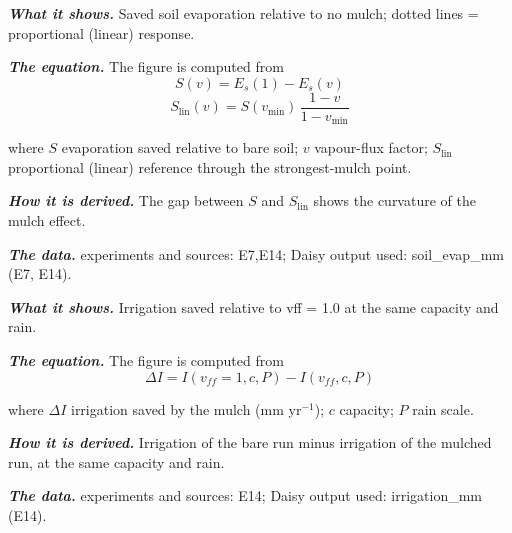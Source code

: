 \label{fig:a20_14}
\par\noindent\textbf{\color{khmag}\emph{What it shows.}} Saved soil evaporation relative to no mulch; dotted lines = proportional (linear) response.
\par\noindent\textbf{\color{khmag}\emph{The equation.}} The figure is computed from
\begin{equation}\boxed{S(v)=E_s(1)-E_s(v)}\end{equation}
\begin{equation}\boxed{S_{\mathrm{lin}}(v)=S(v_{\min})\,\dfrac{1-v}{1-v_{\min}}}\end{equation}
\par\noindent where $S$ evaporation saved relative to bare soil; $v$ vapour-flux factor; $S_{\mathrm{lin}}$ proportional (linear) reference through the strongest-mulch point.
\par\noindent\textbf{\color{khmag}\emph{How it is derived.}} The gap between $S$ and $S_{\mathrm{lin}}$ shows the curvature of the mulch effect.
\par\noindent\textbf{\color{khmag}\emph{The data.}} experiments and sources: E7,E14; Daisy output used: soil\_evap\_mm (E7, E14).
\par\vspace{6pt}\noindent{}\par\nobreak
{}\label{fig:a20_15}
\par\noindent\textbf{\color{khmag}\emph{What it shows.}} Irrigation saved relative to vff = 1.0 at the same capacity and rain.
\par\noindent\textbf{\color{khmag}\emph{The equation.}} The figure is computed from
\begin{equation}\boxed{\Delta I=I(v_{ff}{=}1,c,P)-I(v_{ff},c,P)}\end{equation}
\par\noindent where $\Delta I$ irrigation saved by the mulch (mm yr$^{-1}$); $c$ capacity; $P$ rain scale.
\par\noindent\textbf{\color{khmag}\emph{How it is derived.}} Irrigation of the bare run minus irrigation of the mulched run, at the same capacity and rain.
\par\noindent\textbf{\color{khmag}\emph{The data.}} experiments and sources: E14; Daisy output used: irrigation\_mm (E14).
\par\vspace{6pt}\noindent{}\par\nobreak
